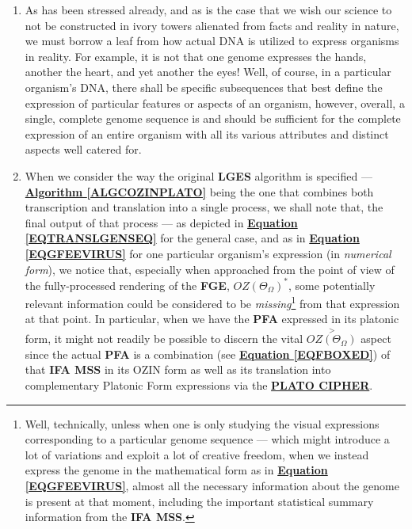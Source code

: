 \documentclass[a4paper, 18pt]{book} %
\begin{document}
\begin{enumerate}
\item As has been stressed already, and as is the case that we wish our science to not be constructed in ivory towers alienated from facts and reality in nature, we must borrow a leaf from how actual DNA is utilized to express organisms in reality. For example, it is not that one genome expresses the hands, another the heart, and yet another the eyes! Well, of course, in a particular organism's DNA, there shall be specific subsequences that best define the expression of particular features or aspects of an organism, however, overall, a single, complete genome sequence is and should be sufficient for the complete expression of an entire organism with all its various attributes and distinct aspects well catered for.
\item When we consider the way the original \textbf{LGES} algorithm is specified --- \textbf{\hyperref[ALGCOZINPLATO]{Algorithm \ref{ALGCOZINPLATO}}} being the one that combines both transcription and translation into a single process, we shall note that, the final output of that process --- as depicted in \textbf{\hyperref[EQTRANSLGENSEQ]{Equation \ref{EQTRANSLGENSEQ}}} for the general case, and as in \textbf{\hyperref[EQGFEEVIRUS]{Equation \ref{EQGFEEVIRUS}}} for one particular organism's expression (in \textit{numerical form}), we notice that, especially when approached from the point of view of the fully-processed rendering of the \textbf{FGE}, $\boxed{OZ(\Theta_\Omega)}^*$, some potentially relevant information could be considered to be \textit{missing}\footnote{Well, technically, unless when one is only studying the visual expressions corresponding to a particular genome sequence --- which might introduce a lot of variations and exploit a lot of creative freedom, when we instead express the genome in the mathematical form as in \textbf{\hyperref[EQGFEEVIRUS]{Equation \ref{EQGFEEVIRUS}}}, almost all the necessary information about the genome is present at that moment, including the important statistical summary information from the \textbf{IFA MSS}.} from that expression at that point. In particular, when we have the \textbf{PFA} expressed in its platonic form, it might not readily be possible to discern the vital $\overset{>}{OZ(\Theta_\Omega)}$ aspect since the actual \textbf{PFA} is a combination (see \textbf{\hyperref[EQFBOXED]{Equation \ref{EQFBOXED}}}) of that \textbf{IFA MSS} in its OZIN form as well as its translation into complementary Platonic Form expressions via the \textbf{\hyperref[FIGPLATONICCIPH]{PLATO CIPHER}}.

\end{enumerate}
\end{document}
